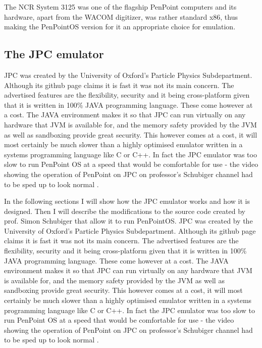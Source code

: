 The NCR System 3125 was one of the flagship PenPoint computers and its
hardware, apart from the WACOM digitizer, was rather standard x86, thus making
the PenPointOS version for it an appropriate choice for emulation.

\subsection{The JPC emulator}

JPC was created by the University of Oxford's Particle Physics Subdepartment.
Although its github page claims it is fast it was not its main concern. The
advertised features are the flexibility, security and it being cross-platform
given that it is written in 100\% JAVA programming language. These come however
at a cost. The JAVA environment makes it so that JPC can run virtually on any
hardware that JVM is available for, and the memory safety provided by the JVM
as well as sandboxing provide great security. This however comes at a cost, it
will most certainly be much slower than a highly optimised emulator written in
a systems programming language like C or C++. In fact the JPC emulator was too
slow to run PenPoint OS at a speed that would be comfortable for use - the
video showing the operation of PenPoint on JPC on professor's Schubiger channel
had to be sped up to look normal \cite{schubiger2015}.

In the following sections I will show how the JPC emulator works and how it is
designed. Then I will describe the modifications to the source code created by
prof. Simon Schubiger that allow it to run PenPointOS.  JPC was created by the
University of Oxford's Particle Physics Subdepartment. Although its github page
claims it is fast it was not its main concern. The advertised features are the
flexibility, security and it being cross-platform given that it is written in
100\% JAVA programming language. These come however at a cost. The JAVA
environment makes it so that JPC can run virtually on any hardware that JVM is
available for, and the memory safety provided by the JVM as well as sandboxing
provide great security. This however comes at a cost, it will most certainly be
much slower than a highly optimised emulator written in a systems programming
language like C or C++. In fact the JPC emulator was too slow to run PenPoint
OS at a speed that would be comfortable for use - the video showing the
operation of PenPoint on JPC on professor's Schubiger channel had to be sped up
to look normal \cite{schubiger2015}.


